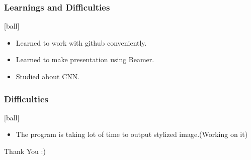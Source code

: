 \documentclass[14pt]{beamer}
\begin{document}
\begin{frame}
		\frametitle{Learnings and Difficulties}
        \begin{itemize}
		\item Learned to work with github conveniently.
		\item Learned to make presentation using Beamer.
		\item Studied about CNN.
		\end{itemize}
\end{frame}

\begin{frame}
		\frametitle{Difficulties}
        \begin{itemize}
				\item The program is taking lot of time to output stylized image.(Working on it)
		\end{itemize}
\end{frame}

\begin{frame}
	                              	Thank You :)
\end{frame}
\end{document}
